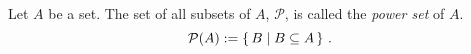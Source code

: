 \guard




\begin{defn}
\label{defn:powerSet}
  Let $A$ be a set.
  The set of all subsets of $A$, $\mathcal{P}$, is called the \emph{power set} of $A$.
  \[ \mathcal{P}(A) := \left\{\, B\mid B\subseteq A\,\right\}\,.\]
\end{defn}
